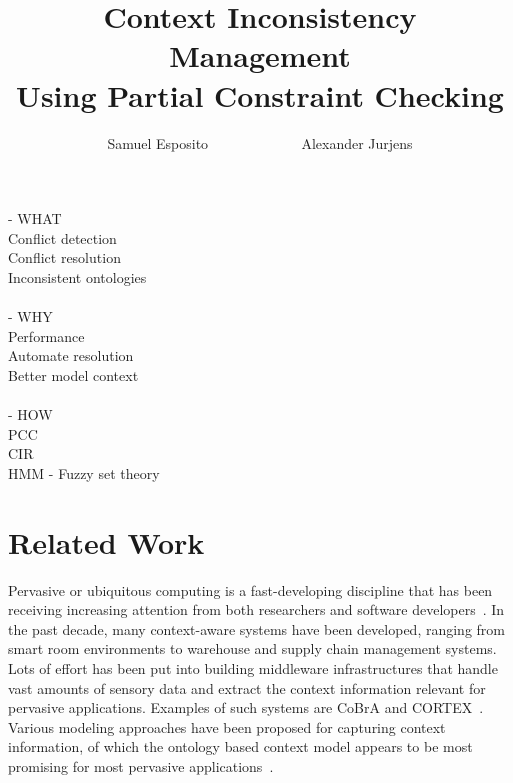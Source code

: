 \documentclass[journal]{vgtc}                %
\title{Context Inconsistency Management \\Using Partial Constraint Checking}
\author{Samuel Esposito ~~~~~~~~~~~~ Alexander Jurjens}
\begin{document}


\maketitle

- WHAT\\
Conflict detection\\
Conflict resolution\\
Inconsistent ontologies\\
~\\
- WHY\\
Performance\\
Automate resolution\\
Better model context\\
~\\
- HOW\\
PCC\\
CIR\\
HMM - Fuzzy set theory\\




\section{Related Work}
Pervasive or ubiquitous computing is a fast-developing discipline that has been receiving increasing attention from both researchers and software developers~\cite{xu:2010:PCC}. In the past decade, many context-aware systems have been developed, ranging from smart room environments to warehouse and supply chain management systems. Lots of effort has been put into building middleware infrastructures that handle vast amounts of sensory data and extract the context information relevant for pervasive applications. Examples of such systems are CoBrA and CORTEX~\cite{bu:2006:CCM}. Various modeling approaches have been proposed for capturing context information, of which the ontology based context model appears to be most promising for most pervasive applications~\cite{bu:2006:CCM}.
\end{document}

